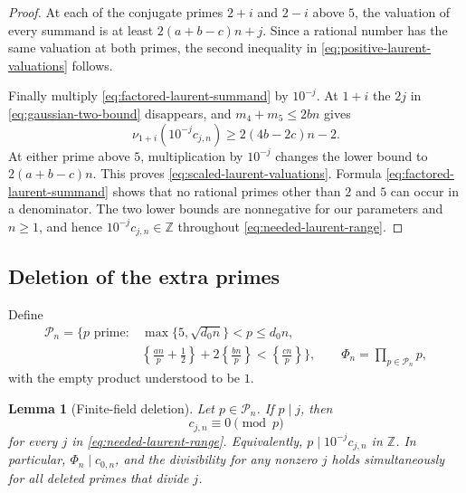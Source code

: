 \documentclass[11pt,reqno,letterpaper]{amsart}
\numberwithin{equation}{section}
\newtheorem{lemma}[theorem]{Lemma}
\theoremstyle{definition}
\theoremstyle{remark}
\begin{document}
\begin{proof}
At each of the conjugate primes $2+i$ and $2-i$ above $5$, the valuation
of every summand is at least $2(a+b-c)n+j$.  Since a rational number has
the same valuation at both primes, the second inequality in
\eqref{eq:positive-laurent-valuations} follows.

Finally multiply \eqref{eq:factored-laurent-summand} by $10^{-j}$.  At
$1+i$ the $2j$ in \eqref{eq:gaussian-two-bound} disappears, and
$m_4+m_5\leq2bn$ gives
\[
 \nu_{1+i}(10^{-j}c_{j,n})
 \geq2(4b-2c)n-2.
\]
At either prime above $5$, multiplication by $10^{-j}$ changes the lower
bound to $2(a+b-c)n$.  This proves
\eqref{eq:scaled-laurent-valuations}.  Formula
\eqref{eq:factored-laurent-summand} shows that no rational primes other
than $2$ and $5$ can occur in a denominator.  The two lower bounds are
nonnegative for our parameters and $n\geq1$, and hence
$10^{-j}c_{j,n}\in\mathbb Z$ throughout \eqref{eq:needed-laurent-range}.
\end{proof}

\subsection{Deletion of the extra primes}

Define
\begin{equation}\label{eq:deleted-prime-set}
 \begin{split}
 \mathcal P_n=\biggl\{p\text{ prime}:{}&
 \max\{5,\sqrt{d_0n}\}<p\leq d_0n,\\
 &\left\{\frac{an}{p}+\frac12\right\}
 +2\left\{\frac{bn}{p}\right\}
 <\left\{\frac{cn}{p}\right\}\biggr\},
 \qquad \Phi_n=\prod_{p\in\mathcal P_n}p ,
\end{split}
\end{equation}
with the empty product understood to be $1$.

\begin{lemma}[Finite-field deletion]\label{lem:finite-field-deletion}
Let $p\in\mathcal P_n$.  If $p\mid j$, then
\begin{equation}\label{eq:deleted-prime-divisibility}
 c_{j,n}\equiv0\pmod p
\end{equation}
for every $j$ in \eqref{eq:needed-laurent-range}.  Equivalently,
$p\mid10^{-j}c_{j,n}$ in $\mathbb Z$.  In particular,
$\Phi_n\mid c_{0,n}$, and the divisibility for any nonzero $j$ holds
simultaneously for all deleted primes that divide $j$.
\end{lemma}
\end{document}

